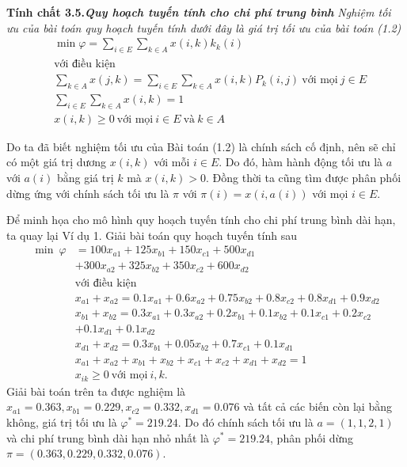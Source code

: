 \documentclass[12pt,a4paper]{report}
\begin{document}
\medskip
{}
\begin{shaded*}
	\noindent
	\textbf{Tính chất 3.5.\textit{Quy hoạch tuyến tính cho chi phí trung bình}} \textit {Nghiệm tối ưu của bài toán quy hoạch tuyến tính dưới đây là giá trị tối ưu của bài toán (1.2)
\begin{align*}
&\min \varphi =\sum_{i \in E} \sum_{k \in A}x(i,k)k_k(i)\\
&\text{với điều kiện}\\
&\sum_{k \in A}x(j,k)=\sum_{i \in E}\sum_{k \in A}x(i,k)P_k(i,j) \ \text{với mọi} \ j \in E\\
&\sum_{i \in E}\sum_{k \in A}x(i,k)=1\\
&x(i,k) \geq 0 \ \text{với mọi} \ i\in E \ \text{và} \ k\in A
\end{align*}
}
\end{shaded*}

\medskip
Do ta đã biết nghiệm tối ưu của Bài toán (1.2) là chính sách cố định, nên sẽ chỉ có một giá trị dương $x(i,k)$ với mỗi $i \in E$. Do đó, hàm hành động tối ưu là $a$ với $a(i)$ bằng giá trị $k$ mà $x(i,k)>0$. Đồng thời ta cũng tìm được phân phối dừng ứng với chính sách tối ưu là $\pi$ với $\pi(i)=x(i,a(i))$ với mọi $i\in E$. 

\medskip
Để minh họa cho mô hình quy hoạch tuyến tính cho chi phí trung bình dài hạn, ta quay lại Ví dụ 1. Giải bài toán quy hoạch tuyến tính sau
\begin{align*}
\min \  \varphi &=100x_{a1}+125x_{b1}+150x_{c1} +500x_{d1}\\
&+300x_{a2}+325x_{b2}+350x_{c2}+600x_{d2}\\
&\text{với điều kiện}\\
&x_{a1}+x_{a2}=0.1x_{a1}+0.6x_{a2}+0.75x_{b2}+0.8x_{c2}+0.8x_{d1}+0.9x_{d2}\\
&x_{b1}+x_{b2}=0.3x_{a1}+0.3x_{a2}+0.2x_{b1}+0.1x_{b2}+0.1x_{c1}+0.2x_{c2}\\
&+0.1x_{d1}+0.1x_{d2}\\
&x_{d1}+x_{d2}=0.3x_{b1}+0.05x_{b2}+0.7x_{c1}+0.1x_{d1}\\
&x_{a1}+x_{a2}+x_{b1}+x_{b2}+x_{c1}+x_{c2}+x_{d1}+x_{d2}=1\\
&x_{ik} \geq 0 \ \text{với mọi} \ i,k.
\end{align*} 
Giải bài toán trên ta được nghiệm là $x_{a1}=0.363, x_{b1}=0.229, x_{c2}=0.332, x_{d1}=0.076$ và tất cả các biến còn lại bằng không, giá trị tối ưu là $\varphi^*=219.24$. Do đó chính sách tối ưu là $a=(1,1,2,1)$ và chi phí trung bình dài hạn nhỏ nhất là $\varphi^*=219.24$, phân phối dừng $\pi=(0.363, 0.229,0.332, 0.076)$.
\end{document}
